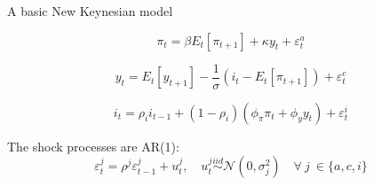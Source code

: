 \begin{frame}{A basic New Keynesian model}
\begin{wideitemize}
\begin{wideenumerate}
\begin{equation}
    	        \pi_t = \beta E_t\left[\pi_{t+1}\right]+\kappa y_t +\varepsilon_t^a
	        \end{equation}
	    \item {}
	     \begin{equation}
    	        y_t = E_t \left[y_{t+1} \right]
    	        - \frac{1}{\sigma}\left(i_t-E_t\left[\pi_{t+1}\right]\right)+\varepsilon_t^c
	        \end{equation}
	         \item {}
	        \begin{equation}
    	        i_t = \rho_ii_{t-1}+ (1-\rho_i)(\phi_\pi \pi_t + \phi_y y_t) + \varepsilon_t^i
            \end{equation}
	\end{wideenumerate}
\item The shock processes are AR(1):
\begin{equation}
\varepsilon_t^j = \rho^j\varepsilon_{t-1}^j +u_t^j, \quad u_t^j\overset{iid}{\sim}\mathcal{N}(0,\sigma_j^2) \quad  \forall \:  j \: \in \{a,c,i\}
\end{equation}
\end{wideitemize}
\end{frame}

